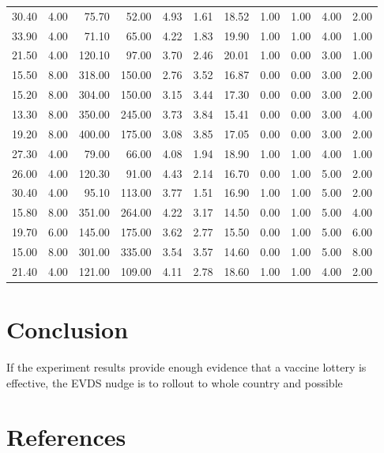 \documentclass[11pt,preprint, authoryear]{elsarticle}
\numberwithin{equation}{section}
\numberwithin{figure}{section}
\numberwithin{table}{section}
\begin{document}
\begin{longtable}{rrrrrrrrrrr}
  30.40 & 4.00 & 75.70 & 52.00 & 4.93 & 1.61 & 18.52 & 1.00 & 1.00 & 4.00 & 2.00 \\ 
  33.90 & 4.00 & 71.10 & 65.00 & 4.22 & 1.83 & 19.90 & 1.00 & 1.00 & 4.00 & 1.00 \\ 
  21.50 & 4.00 & 120.10 & 97.00 & 3.70 & 2.46 & 20.01 & 1.00 & 0.00 & 3.00 & 1.00 \\ 
  15.50 & 8.00 & 318.00 & 150.00 & 2.76 & 3.52 & 16.87 & 0.00 & 0.00 & 3.00 & 2.00 \\ 
  15.20 & 8.00 & 304.00 & 150.00 & 3.15 & 3.44 & 17.30 & 0.00 & 0.00 & 3.00 & 2.00 \\ 
  13.30 & 8.00 & 350.00 & 245.00 & 3.73 & 3.84 & 15.41 & 0.00 & 0.00 & 3.00 & 4.00 \\ 
  19.20 & 8.00 & 400.00 & 175.00 & 3.08 & 3.85 & 17.05 & 0.00 & 0.00 & 3.00 & 2.00 \\ 
  27.30 & 4.00 & 79.00 & 66.00 & 4.08 & 1.94 & 18.90 & 1.00 & 1.00 & 4.00 & 1.00 \\ 
  26.00 & 4.00 & 120.30 & 91.00 & 4.43 & 2.14 & 16.70 & 0.00 & 1.00 & 5.00 & 2.00 \\ 
  30.40 & 4.00 & 95.10 & 113.00 & 3.77 & 1.51 & 16.90 & 1.00 & 1.00 & 5.00 & 2.00 \\ 
  15.80 & 8.00 & 351.00 & 264.00 & 4.22 & 3.17 & 14.50 & 0.00 & 1.00 & 5.00 & 4.00 \\ 
  19.70 & 6.00 & 145.00 & 175.00 & 3.62 & 2.77 & 15.50 & 0.00 & 1.00 & 5.00 & 6.00 \\ 
  15.00 & 8.00 & 301.00 & 335.00 & 3.54 & 3.57 & 14.60 & 0.00 & 1.00 & 5.00 & 8.00 \\ 
  21.40 & 4.00 & 121.00 & 109.00 & 4.11 & 2.78 & 18.60 & 1.00 & 1.00 & 4.00 & 2.00 \\ 
   \bottomrule
\end{longtable}
\endgroup

\hfill

\hypertarget{conclusion}{%
\section{\texorpdfstring{Conclusion
\label{con}}{Conclusion }}\label{conclusion}}

If the experiment results provide enough evidence that a vaccine lottery
is effective, the EVDS nudge is to rollout to whole country and possible

\newpage

\hypertarget{references}{%
\section*{References}\label{references}}
\end{document}
